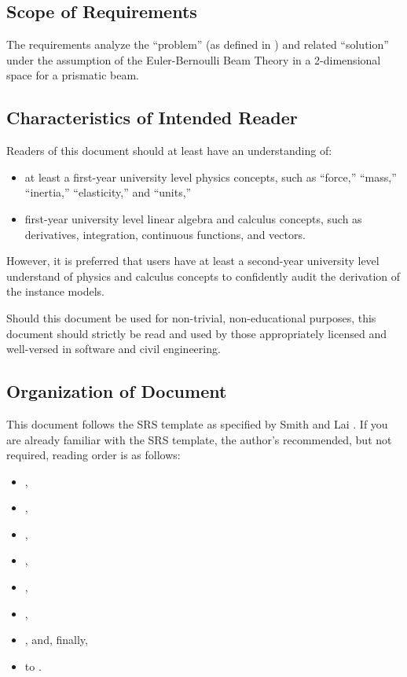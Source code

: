 \documentclass[12pt]{article}
\begin{document}
\subsection{Scope of Requirements}
\label{ssec_scope}

The requirements analyze the ``problem'' (as defined in ) and
related ``solution'' under the assumption of the Euler-Bernoulli Beam Theory
\cite{EulerBernoulliWiki} in a 2-dimensional space for a prismatic beam.

\subsection{Characteristics of Intended Reader}
\label{sec_IntendedReader}

Readers of this document should at least have an understanding of:
\begin{itemize}
    \item at least a first-year university level physics concepts, such as
          ``force,'' ``mass,'' ``inertia,'' ``elasticity,'' and ``units,''
    \item first-year university level linear algebra and calculus concepts, such
          as derivatives, integration, continuous functions, and vectors.
\end{itemize}

However, it is preferred that users have at least a second-year university level
understand of physics and calculus concepts to confidently audit the derivation
of the instance models.

Should this document be used for non-trivial, non-educational purposes, this
document should strictly be read and used by those appropriately licensed and
well-versed in software and civil engineering.

\subsection{Organization of Document}

This document follows the SRS template as specified by Smith and Lai
\cite{SmithAndLai2005}. If you are already familiar with the SRS template, the
author's recommended, but not required, reading order is as follows:

\begin{itemize}
    \item {},
    \item {},
    \item {},
    \item {},
    \item {},
    \item {},
    \item {}, and, finally,
    \item {} to .
\end{itemize}
\end{document}
